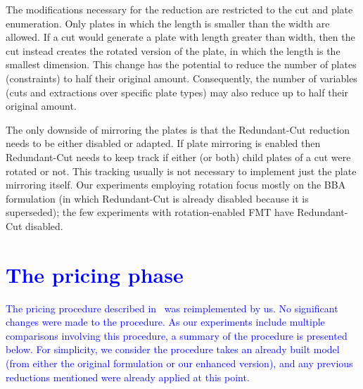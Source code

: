 \documentclass[ppgc,tese,english,formais,babel]{iiufrgs}
\newif\iffinalversion
\newcommand{\newtext}[1]{\iffinalversion%
#1%
\else%
\textcolor{blue}{#1}%
\fi%
}
\begin{document}
The modifications necessary for the reduction are restricted to the cut and plate enumeration.
Only plates in which the length is smaller than the width are allowed.
If a cut would generate a plate with length greater than width, then the cut instead creates the rotated version of the plate, in which the length is the smallest dimension.
This change has the potential to reduce the number of plates (constraints) to half their original amount.
Consequently, the number of variables (cuts and extractions over specific plate types) may also reduce up to half their original amount.

The only downside of mirroring the plates is that the Redundant-Cut reduction needs to be either disabled or adapted.
If plate mirroring is enabled then Redundant-Cut needs to keep track if either (or both) child plates of a cut were rotated or not.
This tracking usually is not necessary to implement just the plate mirroring itself.
Our experiments employing rotation focus mostly on the BBA formulation (in which Redundant-Cut is already disabled because it is superseded); the few experiments with rotation-enabled FMT have Redundant-Cut disabled.

\section{\newtext{The pricing phase}}
\label{sec:pricing}

\newtext{
The pricing procedure described in~\cite{furini:2016,dimitri_thesis} was reimplemented by us.
No significant changes were made to the procedure.
As our experiments include multiple comparisons involving this procedure, a summary of the procedure is presented below.
For simplicity, we consider the procedure takes an already built model (from either the original formulation or our enhanced version), and any previous reductions mentioned were already applied at this point.
}
\end{document}
